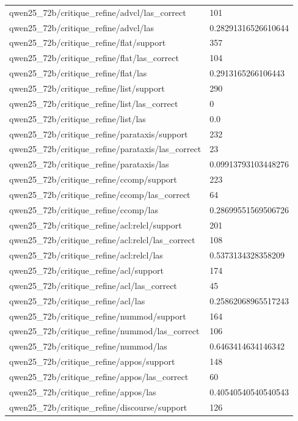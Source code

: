 \begin{tabular}{ll}
qwen25\_72b/critique\_refine/advcl/las\_correct & 101 \\
qwen25\_72b/critique\_refine/advcl/las & 0.28291316526610644 \\
qwen25\_72b/critique\_refine/flat/support & 357 \\
qwen25\_72b/critique\_refine/flat/las\_correct & 104 \\
qwen25\_72b/critique\_refine/flat/las & 0.2913165266106443 \\
qwen25\_72b/critique\_refine/list/support & 290 \\
qwen25\_72b/critique\_refine/list/las\_correct & 0 \\
qwen25\_72b/critique\_refine/list/las & 0.0 \\
qwen25\_72b/critique\_refine/parataxis/support & 232 \\
qwen25\_72b/critique\_refine/parataxis/las\_correct & 23 \\
qwen25\_72b/critique\_refine/parataxis/las & 0.09913793103448276 \\
qwen25\_72b/critique\_refine/ccomp/support & 223 \\
qwen25\_72b/critique\_refine/ccomp/las\_correct & 64 \\
qwen25\_72b/critique\_refine/ccomp/las & 0.28699551569506726 \\
qwen25\_72b/critique\_refine/acl:relcl/support & 201 \\
qwen25\_72b/critique\_refine/acl:relcl/las\_correct & 108 \\
qwen25\_72b/critique\_refine/acl:relcl/las & 0.5373134328358209 \\
qwen25\_72b/critique\_refine/acl/support & 174 \\
qwen25\_72b/critique\_refine/acl/las\_correct & 45 \\
qwen25\_72b/critique\_refine/acl/las & 0.25862068965517243 \\
qwen25\_72b/critique\_refine/nummod/support & 164 \\
qwen25\_72b/critique\_refine/nummod/las\_correct & 106 \\
qwen25\_72b/critique\_refine/nummod/las & 0.6463414634146342 \\
qwen25\_72b/critique\_refine/appos/support & 148 \\
qwen25\_72b/critique\_refine/appos/las\_correct & 60 \\
qwen25\_72b/critique\_refine/appos/las & 0.40540540540540543 \\
qwen25\_72b/critique\_refine/discourse/support & 126 \\

\end{tabular}

